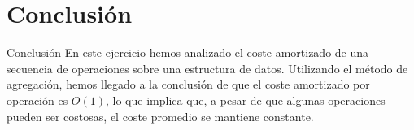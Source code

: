 \documentclass[aspectratio=169]{beamer}
\begin{document}
\section{Conclusión}
\begin{frame}{Conclusión}
    En este ejercicio hemos analizado el coste amortizado de una secuencia de operaciones sobre una estructura de datos. Utilizando el método de agregación, hemos llegado a la conclusión de que el coste amortizado por operación es $O(1)$, lo que implica que, a pesar de que algunas operaciones pueden ser costosas, el coste promedio se mantiene constante.
\end{frame}
\end{document}
